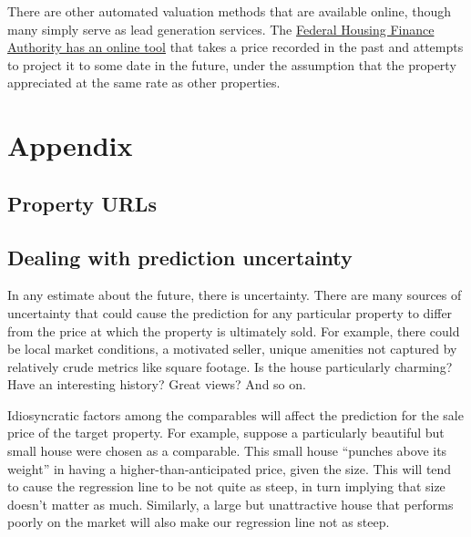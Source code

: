 \documentclass[
12pt, %
letterpaper, %
oneside, %
headinclude,footinclude, %
BCOR5mm, %
]{scrartcl}
\begin{document}
There are other automated valuation methods that are available online, though many simply serve as lead generation services.
The \href{https://www.fhfa.gov/DataTools/Tools/Pages/HPI-Calculator.aspx}{Federal Housing Finance Authority has an online tool} that takes a price recorded in the past and attempts to project it to some date in the future, under the assumption that the property appreciated at the same rate as other properties. 

\renewcommand{\refname}{\spacedlowsmallcaps{References}} %


\pagebreak

\appendix

\section{Appendix} 
\subsection{Property URLs} \label{sec:urls}

\begin{itemize}
  
\end{itemize}

\subsection{Dealing with prediction uncertainty}  \label{sec:bootstrapping} 
In any estimate about the future, there is uncertainty.
There are many sources of uncertainty that could cause the prediction for any particular property to differ from the price at which the property is ultimately sold.
For example, there could be local market conditions, a motivated seller, unique amenities not captured by relatively crude metrics like square footage. Is the house particularly charming? Have an interesting history? Great views? And so on. 

Idiosyncratic factors among the comparables will affect the prediction for the sale price of the target property.
For example, suppose a particularly beautiful but small house were chosen as a comparable.
This small house ``punches above its weight'' in having a higher-than-anticipated price, given the size.
This will tend to cause the regression line to be not quite as steep, in turn implying that size doesn't matter as much.
Similarly, a large but unattractive house that performs poorly on the market will also make our regression line not as steep.
\end{document}
